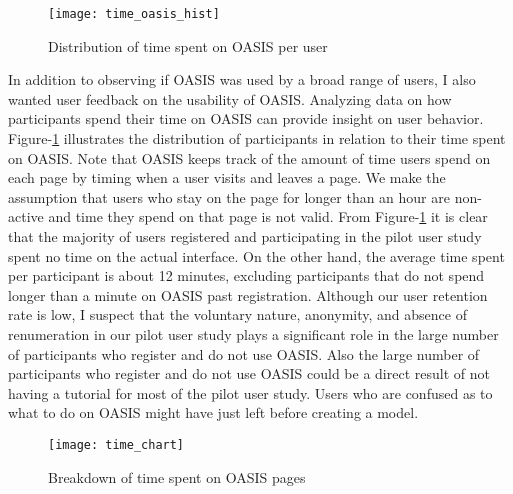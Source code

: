\begin{figure}[!ht]
	\centering
	\texttt{[image: time\_oasis\_hist]}
	\caption{Distribution of time spent on OASIS per user}
	\label{fig:time_oasis_hist}
\end{figure}

In addition to observing if OASIS was used by a broad range of users, I also wanted user feedback on the usability of OASIS.
Analyzing data on how participants spend their time  on OASIS can provide insight on user behavior.
Figure-\ref{fig:time_oasis_hist} illustrates the distribution of participants in relation to their time spent on OASIS.
Note that OASIS keeps track of the amount of time users spend on each page by timing when a user visits and leaves a page. We make the assumption that users who stay on the page for longer than an hour are non-active and time they spend on that page is not valid.
From Figure-\ref{fig:time_oasis_hist} it is clear that the majority of users registered and participating in the pilot user study spent no time on the actual interface.
On the other hand, the average time spent per participant is about 12 minutes, excluding participants that do not spend longer than a minute on OASIS past registration.
Although our user retention rate is low, I suspect that the voluntary nature, anonymity, and absence of renumeration in our pilot user study plays a significant role in the large number of participants who register and do not use OASIS.
Also  the large number of participants who register and do not use OASIS  could be a direct result of not having a tutorial for most of the pilot user study.
Users who are confused as to what to do on OASIS might have just left before creating a model.

\begin{figure}[!ht]
	\centering
	\texttt{[image: time\_chart]}
	\caption{Breakdown of time spent on OASIS pages}
	\label{fig:time_chart}
\end{figure}

